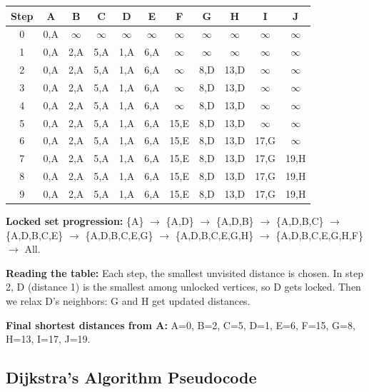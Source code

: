 \documentclass[12pt,portrait]{article}
\begin{document}
\begingroup
\tiny
\setlength{\tabcolsep}{2pt}
\begin{center}
\begin{tabular}{c|c|c|c|c|c|c|c|c|c|c}
\toprule
\textbf{Step} & \textbf{A} & \textbf{B} & \textbf{C} & \textbf{D} & \textbf{E} & \textbf{F} & \textbf{G} & \textbf{H} & \textbf{I} & \textbf{J} \\
\midrule
0 & 0,A & $\infty$ & $\infty$ & $\infty$ & $\infty$ & $\infty$ & $\infty$ & $\infty$ & $\infty$ & $\infty$ \\
1 & 0,A & 2,A & 5,A & 1,A & 6,A & $\infty$ & $\infty$ & $\infty$ & $\infty$ & $\infty$ \\
2 & 0,A & 2,A & 5,A & 1,A & 6,A & $\infty$ & 8,D & 13,D & $\infty$ & $\infty$ \\
3 & 0,A & 2,A & 5,A & 1,A & 6,A & $\infty$ & 8,D & 13,D & $\infty$ & $\infty$ \\
4 & 0,A & 2,A & 5,A & 1,A & 6,A & $\infty$ & 8,D & 13,D & $\infty$ & $\infty$ \\
5 & 0,A & 2,A & 5,A & 1,A & 6,A & 15,E & 8,D & 13,D & $\infty$ & $\infty$ \\
6 & 0,A & 2,A & 5,A & 1,A & 6,A & 15,E & 8,D & 13,D & 17,G & $\infty$ \\
7 & 0,A & 2,A & 5,A & 1,A & 6,A & 15,E & 8,D & 13,D & 17,G & 19,H \\
8 & 0,A & 2,A & 5,A & 1,A & 6,A & 15,E & 8,D & 13,D & 17,G & 19,H \\
9 & 0,A & 2,A & 5,A & 1,A & 6,A & 15,E & 8,D & 13,D & 17,G & 19,H \\
\bottomrule
\end{tabular}
\end{center}
\endgroup

\vspace{4pt}
\begingroup
\footnotesize
\textbf{Locked set progression:} \{A\} $\to$ \{A,D\} $\to$ \{A,D,B\} $\to$ \{A,D,B,C\} $\to$ \{A,D,B,C,E\} $\to$ \{A,D,B,C,E,G\} $\to$ \{A,D,B,C,E,G,H\} $\to$ \{A,D,B,C,E,G,H,F\} $\to$ All.

\textbf{Reading the table:} Each step, the smallest unvisited distance is chosen. In step 2, D (distance 1) is the smallest among unlocked vertices, so D gets locked. Then we relax D's neighbors: G and H get updated distances.

\textbf{Final shortest distances from A:} A=0, B=2, C=5, D=1, E=6, F=15, G=8, H=13, I=17, J=19.
\endgroup

\subsection{Dijkstra's Algorithm Pseudocode}
\end{document}
